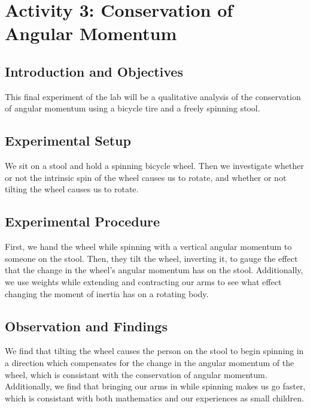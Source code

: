 \documentclass[12pt]{amsart}
\begin{document}
		\section*{Activity 3: Conservation of Angular Momentum}
			\subsection*{Introduction and Objectives}
			This final experiment of the lab will be a qualitative analysis of the conservation of angular momentum using a bicycle tire and a freely spinning stool.
			\subsection*{Experimental Setup}
			We sit on a stool and hold a spinning bicycle wheel. Then we investigate whether or not the intrinsic spin of the wheel causes us to rotate, and whether or not tilting the wheel causes us to rotate.
			\subsection*{Experimental Procedure}
			First, we hand the wheel while spinning with a vertical angular momentum to someone on the stool. Then, they tilt the wheel, inverting it, to gauge the effect that the change in the wheel's angular momentum has on the stool.
			Additionally, we use weights while extending and contracting our arms to see what effect changing the moment of inertia has on a rotating body.
			\subsection*{Observation and Findings}
			We find that tilting the wheel causes the person on the stool to begin spinning in a direction which compensates for the change in the angular momentum of the wheel, which is consistant with the conservation of angular momentum. Additionally, we find that bringing our arms in while spinning makes us go faster, which is consistant with both mathematics and our experiences as small children.
	
\end{document}
